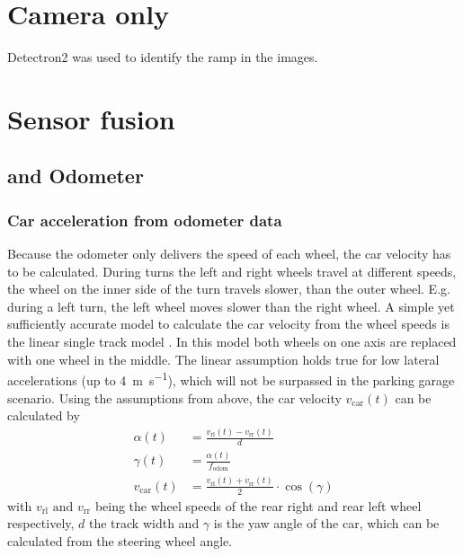 \section{Camera only}
Detectron2 was used to identify the ramp in the images.


\section{Sensor fusion}


\subsection{ and Odometer}
\subsubsection{Car acceleration from odometer data}
\label{subsubsec:acc_from_odom}
Because the odometer only delivers the speed of each wheel, the car velocity has to be calculated.
During turns the left and right wheels travel at different speeds, the wheel on the inner side of the turn travels slower, than the outer wheel.
E.g. during a left turn, the left wheel moves slower than the right wheel.
A simple yet sufficiently accurate model to calculate the car velocity from the wheel speeds is the linear single track model \cite{Mitschke2014}.
In this model both wheels on one axis are replaced with one wheel in the middle.
The linear assumption holds true for low lateral accelerations (up to \SI{4}{\metre\per\second}), which will not be surpassed in the parking garage scenario.
Using the assumptions from above, the car velocity $v_\mathrm{car}(t)$ can be calculated by
\begin{align}
	\alpha(t)         & = \frac{v_\mathrm{rl}(t) - v_\mathrm{rr}(t)}{d}                  \\
	\gamma(t)         & = \frac{\alpha(t)}{f_\mathrm{odom}}                              \\
	v_\mathrm{car}(t) & = \frac{v_\mathrm{rl}(t) + v_\mathrm{rr}(t)}{2}\cdot\cos(\gamma)
\end{align}
with $v_\mathrm{rl} \text{ and } v_\mathrm{rr}$ being the wheel speeds of the rear right and rear left wheel respectively, $d$ the track width and $\gamma$ is the yaw angle of the car, which can be calculated from the steering wheel angle.\\
